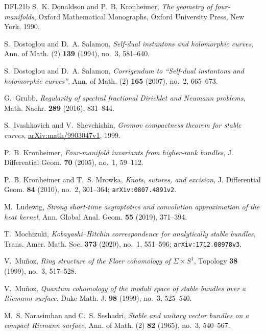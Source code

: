 \documentclass[11pt]{amsart}
\theoremstyle{definition}
\theoremstyle{remark}
\theoremstyle{plain}
\begin{document}
\begin{thebibliography}{DFL21b}
 S.~K. Donaldson and P.~B. Kronheimer,
\emph{The geometry of four-manifolds}, Oxford Mathematical Monographs,
Oxford University Press, New York, 1990.

 S.~Dostoglou and D.~A. Salamon,
\emph{Self-dual instantons and holomorphic curves}, Ann. of Math. (2)
\textbf{139} (1994), no.~3, 581--640.

 S.~Dostoglou and D.~A. Salamon,
\emph{Corrigendum to ``Self-dual instantons and holomorphic curves''},
Ann. of Math. (2) \textbf{165} (2007), no.~2, 665--673.

 G.~Grubb, \emph{Regularity of spectral
fractional Dirichlet and Neumann problems}, Math. Nachr.
\textbf{289} (2016), 831--844.

 S.~Ivashkovich
and V.~Shevchishin,
\emph{Gromov compactness theorem for stable curves},
\href{https://arxiv.org/abs/math/9903047v1}{arXiv:\allowbreak math/\allowbreak 9903047v1}, 1999.

 P.~B. Kronheimer,
\emph{Four-manifold invariants from higher-rank bundles},
J. Differential Geom. \textbf{70} (2005), no.~1, 59--112.

 P.~B. Kronheimer and T.~S. Mrowka,
\emph{Knots, sutures, and excision}, J. Differential Geom.
\textbf{84} (2010), no.~2, 301--364;
\texttt{arXiv:0807.4891v2}.

 M.~Ludewig,
\emph{Strong short-time asymptotics and convolution approximation of the
heat kernel}, Ann. Global Anal. Geom. \textbf{55} (2019), 371--394.


 T.~Mochizuki,
\emph{Kobayashi--Hitchin correspondence for analytically stable
bundles}, Trans. Amer. Math. Soc. \textbf{373} (2020), no.~1,
551--596; \texttt{arXiv:1712.08978v3}.

 V.~Mu\~noz, \emph{Ring structure of the
Floer cohomology of $\Sigma\times S^1$}, Topology \textbf{38} (1999),
no.~3, 517--528.

 V.~Mu\~noz, \emph{Quantum cohomology of the
moduli space of stable bundles over a Riemann surface}, Duke Math. J.
\textbf{98} (1999), no.~3, 525--540.

 M.~S. Narasimhan and C.~S. Seshadri,
\emph{Stable and unitary vector bundles on a compact Riemann surface},
Ann. of Math. (2) \textbf{82} (1965), no.~3, 540--567.



\end{thebibliography}
\end{document}
